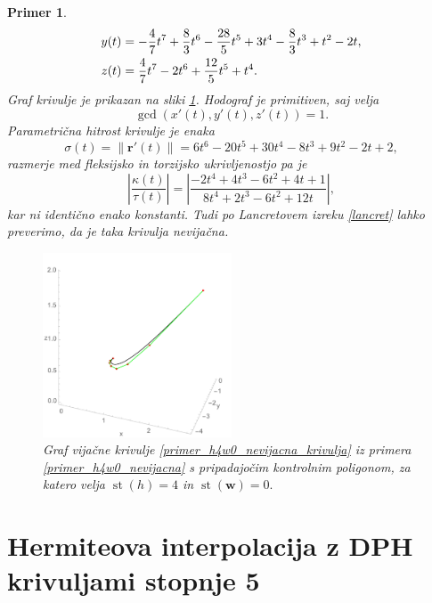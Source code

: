 \documentclass[12pt,a4paper,twoside]{article}
\theoremstyle{definition} %
\theoremstyle{plain} %
\theoremstyle{primerstyle}
\newtheorem{primer}[definicija]{Primer}
\numberwithin{equation}{section}  %
\newcommand{\rV}{\mathbf{r}}
\newcommand{\wV}{\mathbf{w}}
\DeclareMathOperator{\st}{st}
\begin{document}
\begin{primer}
\begin{align}
		y(t)&=-\frac{4}{7}t^7+\frac{8}{3}t^6-\frac{28}{5}t^5+3t^4-\frac{8}{3}t^3+t^2-2t,\label{primer_h4w0_nevijacna_krivulja}\\
		z(t)&=\frac{4}{7}t^7-2t^6+\frac{12}{5}t^5+t^4.\notag
	\end{align}
	Graf krivulje je prikazan na sliki \ref{fig:h4w0_nevijacna}. Hodograf je primitiven, saj velja $$\gcd(x'(t),y'(t),z'(t))=1.$$ Parametrična hitrost krivulje je enaka
	\begin{equation*}
		\sigma(t)=\lVert\rV'(t)\rVert=6t^6-20t^5+30t^4-8t^3+9t^2-2t+2,
	\end{equation*}
	razmerje med fleksijsko in torzijsko ukrivljenostjo pa je
	\begin{equation*}
		\left|\frac{\kappa(t)}{\tau(t)}\right|=\left|\frac{-2t^4+4t^3-6t^2+4t+1}{8t^4+2t^3-6t^2+12t}\right|,
	\end{equation*}
	kar ni identično enako konstanti. Tudi po Lancretovem izreku \ref{lancret} lahko preverimo, da je taka krivulja nevijačna.
	\clearpage
	\begin{figure}[t]
	  \centering
	  \includegraphics[width=0.5\textwidth]{images/h4w0_nevijacna.pdf}
	  \caption[Primer nevijačne krivulje ($\st(h)=4,$ $\st(\wV)=0$)]{Graf vijačne krivulje \eqref{primer_h4w0_nevijacna_krivulja} iz primera \ref{primer_h4w0_nevijacna} s pripadajočim kontrolnim poligonom, za katero velja $\st(h)=4$ in $\st(\wV)=0.$}
	  \label{fig:h4w0_nevijacna}
	\end{figure}\null
\end{primer}
\clearpage

\section{Hermiteova interpolacija z DPH krivuljami stopnje 5}
\end{document}
